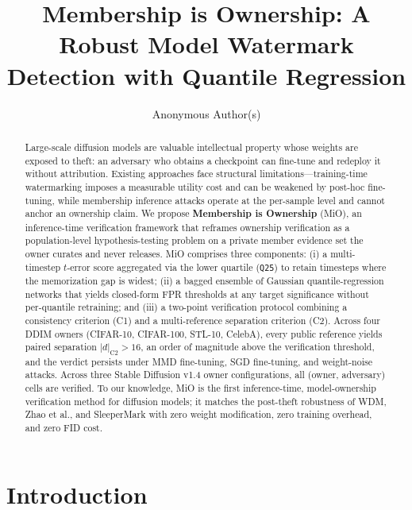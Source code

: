 \documentclass{article}
\title{Membership is Ownership: A Robust Model Watermark Detection with Quantile Regression}
\author{%
  Anonymous Author(s)
}
\begin{document}
\maketitle

\begin{abstract}
Large-scale diffusion models are valuable intellectual property whose weights are exposed to theft: an adversary who obtains a checkpoint can fine-tune and redeploy it without attribution. Existing approaches face structural limitations---training-time watermarking imposes a measurable utility cost and can be weakened by post-hoc fine-tuning, while membership inference attacks operate at the per-sample level and cannot anchor an ownership claim. We propose \textbf{Membership is Ownership} (MiO), an inference-time verification framework that reframes ownership verification as a population-level hypothesis-testing problem on a private member evidence set the owner curates and never releases. MiO comprises three components: (i) a multi-timestep $t$-error score aggregated via the lower quartile (\texttt{Q25}) to retain timesteps where the memorization gap is widest; (ii) a bagged ensemble of Gaussian quantile-regression networks that yields closed-form FPR thresholds at any target significance without per-quantile retraining; and (iii) a two-point verification protocol combining a consistency criterion (C1) and a multi-reference separation criterion (C2). Across four DDIM owners (CIFAR-10, CIFAR-100, STL-10, CelebA), every public reference yields paired separation $|d|_{\text{C2}} > 16$, an order of magnitude above the verification threshold, and the verdict persists under MMD fine-tuning, SGD fine-tuning, and weight-noise attacks. Across three Stable Diffusion v1.4 owner configurations, all (owner, adversary) cells are verified. To our knowledge, MiO is the first inference-time, model-ownership verification method for diffusion models; it matches the post-theft robustness of WDM, Zhao et al., and SleeperMark with zero weight modification, zero training overhead, and zero FID cost.
\end{abstract}

\section{Introduction}
\label{sec:intro}
\end{document}

